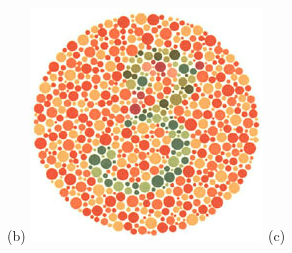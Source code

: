 \documentclass[	12pt, Times, openright, twoside, a4paper, english, brazil]{abntex2}
\begin{document}
\begin{apendicesenv}
\begin{figure}[!htb]
(b)
\endminipage\hfill
{}
\centering
{\includegraphics[width=\linewidth]{ishihara-transformacao/plate7.jpg}}
(c)
\endminipage\hfill


\end{figure}
\end{apendicesenv}
\end{document}
